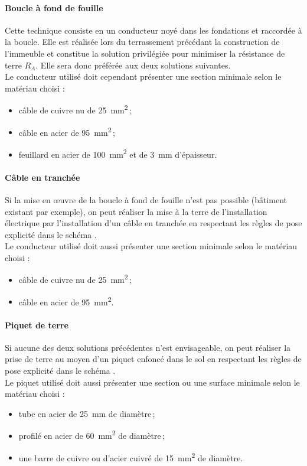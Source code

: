 \paragraph{Boucle à fond de fouille}
Cette technique consiste en un conducteur noyé dans les fondations et raccordée à la boucle. Elle est réalisée lors du terrassement précédant la construction de l'immeuble et constitue la solution privilégiée pour minimiser la résistance de terre $R_A$. Elle sera donc préférée aux deux solutions suivantes.\\
Le conducteur utilisé doit cependant présenter une section minimale selon le matériau choisi :
\begin{itemize}
\item câble de cuivre nu de \SI{25}{\square\milli\meter}\,;
\item câble en acier de \SI{95}{\square\milli\meter}\,;
\item feuillard en acier de \SI{100}{\square\milli\meter} et de \SI{3}{\milli\meter} d'épaisseur.
\end{itemize}


\paragraph{Câble en tranchée}
Si la mise en \oe{}uvre de la boucle à fond de fouille n'est pas possible (bâtiment existant par exemple), on peut réaliser la mise à la terre de l'installation électrique par l'installation d'un câble en tranchée en respectant les règles de pose explicité dans le schéma .\\
Le conducteur utilisé doit aussi présenter une section minimale selon le matériau choisi :
\begin{itemize}
\item câble de cuivre nu de \SI{25}{\square\milli\meter}\,;
\item câble en acier de \SI{95}{\square\milli\meter}.
\end{itemize}



\paragraph{Piquet de terre}
Si aucune des deux solutions précédentes n'est envisageable, on peut réaliser la prise de terre au moyen d'un piquet enfoncé dans le sol en respectant les règles de pose explicité dans le schéma .\\
Le piquet utilisé doit aussi présenter une section ou une surface minimale selon le matériau choisi :
\begin{itemize}
\item tube en acier de \SI{25}{\milli\meter} de diamètre\,;
\item profilé en acier de \SI{60}{\square\milli\meter} de diamètre\,;
\item une barre de cuivre ou d'acier cuivré de \SI{15}{\square\milli\meter} de diamètre.
\end{itemize}

